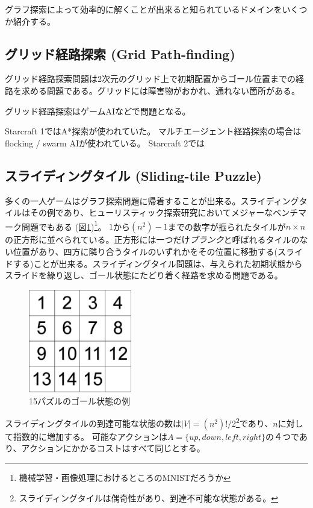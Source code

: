 \documentclass{report}
\begin{document}
グラフ探索によって効率的に解くことが出来ると知られているドメインをいくつか紹介する。


\subsection{グリッド経路探索 (Grid Path-finding)}

グリッド経路探索問題は2次元のグリッド上で初期配置からゴール位置までの経路を求める問題である。グリッドには障害物がおかれ、通れない箇所がある。

グリッド経路探索はゲームAIなどで問題となる。


Starcraft 1ではA*探索が使われていた。
マルチエージェント経路探索の場合はflocking / swarm AIが使われている。
Starcraft 2では


\subsection{スライディングタイル (Sliding-tile Puzzle)}

多くの一人ゲームはグラフ探索問題に帰着することが出来る。スライディングタイルはその例であり、ヒューリスティック探索研究においてメジャーなベンチマーク問題でもある (図\ref{fig:15-puzzle})\footnote{機械学習・画像処理におけるところのMNISTだろうか}。
$1$から$(n^2)-1$までの数字が振られたタイルが$n\times n$の正方形に並べられている。正方形には一つだけ{\it ブランク}と呼ばれるタイルのない位置があり、四方に隣り合うタイルのいずれかをその位置に移動する(スライドする)ことが出来る。スライディングタイル問題は、与えられた初期状態からスライドを繰り返し、ゴール状態にたどり着く経路を求める問題である。

\begin{figure}
\centering
\includegraphics[width=0.4\textwidth]{figures/15-puzzle.pdf}
\caption{15パズルのゴール状態の例}
\label{fig:15-puzzle}
\end{figure}

スライディングタイルの到達可能な状態の数は$|V| = (n^2)!/2$\footnote{スライディングタイルは偶奇性があり、到達不可能な状態がある\cite{TODO}。}であり、$n$に対して指数的に増加する。
可能なアクションは$A= \{up, down, left, right\}$の４つであり、アクションにかかるコストはすべて同じとする。
\end{document}
